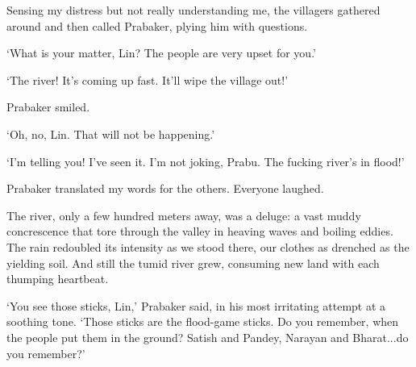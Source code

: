 {	Sensing my distress but not really understanding me, the villagers gathered around and then called Prabaker, plying him with questions.
	
	`What is your matter, Lin? The people are very upset for you.'
	
	`The river! It's coming up fast. It'll wipe the village out!'
	
	Prabaker smiled.
	
	`Oh, no, Lin. That will not be happening.'
	
	`I'm telling you! I've seen it. I'm not joking, Prabu. The fucking river's in flood!'
	
	Prabaker translated my words for the others. Everyone laughed.
	
%	
	
	The river, only a few hundred meters away, was a deluge: a vast muddy concrescence that tore through the valley in heaving waves and boiling eddies. The rain redoubled its intensity as we stood there, our clothes as drenched as the yielding soil. And still the tumid river grew, consuming new land with each thumping heartbeat.
	
	`You see those sticks, Lin,' Prabaker said, in his most irritating attempt at a soothing tone. `Those sticks are the flood-game sticks. Do you remember, when the people put them in the ground? Satish and Pandey, Narayan and Bharat...do you remember?'
	
%	
%	
%	
	
}
